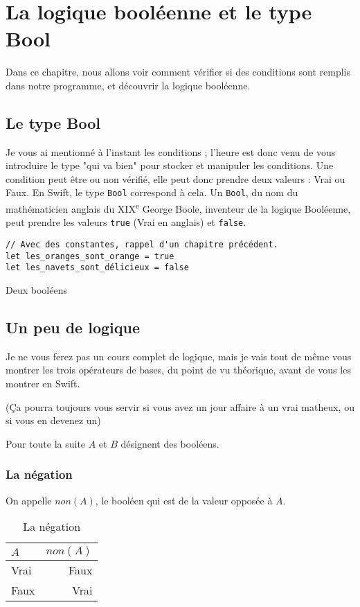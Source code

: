 \chapter{La logique booléenne et le type Bool}
Dans ce chapitre, nous allons voir comment vérifier si des conditions sont remplis dans notre programme, et découvrir la logique booléenne.

\section{Le type Bool}
Je vous ai mentionné à l'instant les conditions ;
l'heure est donc venu de vous introduire le type
"qui va bien" pour stocker et manipuler les conditions.
Une condition peut être ou non vérifié, elle peut donc prendre deux valeurs : Vrai ou Faux.
En Swift, le type \texttt{Bool} correspond à cela. Un \texttt{Bool}, du nom du mathématicien anglais du XIX\textsuperscript{e} George Boole,
inventeur de la logique Booléenne, peut prendre les valeurs \texttt{true} (Vrai en anglais) et \texttt{false}.
\begin{listing}
\begin{verbatim}
// Avec des constantes, rappel d'un chapitre précédent.
let les_oranges_sont_orange = true
let les_navets_sont_délicieux = false
\end{verbatim}
\caption{Deux booléens}
\end{listing}
\section{Un peu de logique}
Je ne vous ferez pas un cours complet de logique, mais je vais tout de même vous montrer les trois opérateurs de bases,
du point de vu théorique, avant de vous les montrer en Swift.

(Ça pourra toujours vous servir si vous avez un jour affaire à un vrai matheux, ou si vous en devenez un)


Pour toute la suite $A$ et $B$ désignent des booléens.
\subsection{La négation}
On appelle $non(A)$, le booléen qui est de la valeur opposée à $A$.
\begin{table}[h]
\centering
\begin{tabu} spread \linewidth {|l|r|}
\hline
$A$ & $non(A)$ \\ \hline
Vrai & Faux \\ \hline
Faux & Vrai \\ \hline
\end{tabu}
\caption{La négation}
\end{table}
